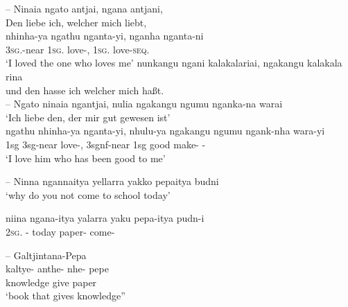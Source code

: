 \documentclass{langscibook}
\begin{document}
\begin{xlist}
\begin{xlist}
\begin{xlist}
--
\ea
\label{bkm:Ref516470384}
\gll   Ninaia                   ngato         antjai,            ngana        antjani,\\
Den liebe ich, welcher mich liebt,\\
\citep[26]{flierl_dieri_1880}
\gll nhinha-ya            ngathu       nganta-yi,     nganha     nganta-ni\\
3\textsc{sg}.-near      1\textsc{sg}.     love-,  1\textsc{sg}.    love-\textsc{seq}.\\
\glt `I loved the one who loves me'
{nunkangu}      {ngani}            {kalakalariai,}           {ngakangu}     {kalakala}  {rina}\\
und den hasse ich welcher mich haßt.\\
\citep[26]{flierl_dieri_1880}
\z
--
\ea        Ngato     ninaia                  ngantjai,      nulia                   ngakangu   ngumu          nganka-na  warai\\
\glt `Ich liebe den, der mir gut gewesen ist' \\
\citep[29]{reuther_dieri_1894}
\gll ngathu    nhinha-ya           nganta-yi,   nhulu-ya              ngakangu  ngumu         ngank-nha  wara-yi\\
1sg      3sg-near           love-,      3sgnf-near         1sg         good                make- -\\
\glt `I love him who has been good to me'
\z




--
\ea
 Ninna          ngannaitya           yellarra   yakko      pepaitya      budni\\
\glt `why do you not come to school today'

\citep{teichelmann_dictionary_1857}

\gll niina           ngana-itya            yalarra   yaku        pepa-itya     pudn-i\\
         2\textsc{sg}.     -     today             paper-       come-\footnotemark\\

\z

--
\ea
    Galtjintana-Pepa\\
\gll kaltye-         anthe-   nhe-        pepe\\
knowledge   give           paper\\
\glt      ‘book that gives knowledge”
\z




\end{xlist}
\end{xlist}
\end{xlist}
\end{document}
